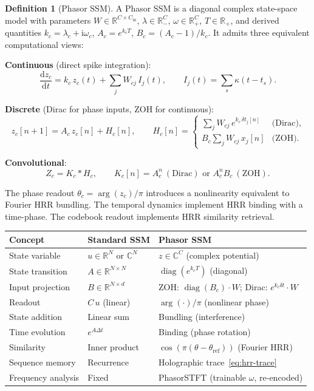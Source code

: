 \documentclass[11pt]{article}
\newcommand{\R}{\mathbb{R}}
\newcommand{\C}{\mathbb{C}}
\newcommand{\im}{\mathrm{i}}
\newcommand{\dd}{\mathrm{d}}
\newcommand{\dt}{\Delta t}
\theoremstyle{definition}
\newtheorem{definition}{Definition}
\begin{document}
\begin{definition}[Phasor SSM]
A Phasor SSM is a diagonal complex state-space model with parameters
$W\in\R^{C\times C_{\mathrm{in}}}$,
$\lambda\in\R^C_-$, $\omega\in\R^C_+$, $T\in\R_+$,
and derived quantities
$k_c = \lambda_c + \im\omega_c$,
$A_c = e^{k_c T}$,
$B_c = (A_c-1)/k_c$.
It admits three equivalent computational views:

\medskip
\noindent\textbf{Continuous} (direct spike integration):
\[
  \frac{\dd z_c}{\dd t} = k_c\,z_c(t) + \sum_j W_{cj}\,I_j(t),
  \qquad I_j(t) = \sum_s \kappa(t-t_s).
\]

\noindent\textbf{Discrete} (Dirac for phase inputs, ZOH for continuous):
\[
  z_c[n+1] = A_c\,z_c[n] + H_c[n],
  \qquad H_c[n] =
  \begin{cases}
    \sum_j W_{cj}\,e^{k_c\,\delta t_j[n]} & \text{(Dirac)},\\
    B_c\sum_j W_{cj}\,x_j[n] & \text{(ZOH)}.
  \end{cases}
\]

\noindent\textbf{Convolutional}:
\[
  Z_c = K_c * H_c, \qquad
  K_c[n] = A_c^n\ (\text{Dirac}) \text{ or } A_c^n B_c\ (\text{ZOH}).
\]

\medskip
\noindent The phase readout $\theta_c = \arg(z_c)/\pi$ introduces a
nonlinearity equivalent to Fourier HRR bundling. The temporal dynamics
implement HRR binding with a time-phase. The codebook readout implements
HRR similarity retrieval.
\end{definition}

\bigskip

\begin{center}
\renewcommand{\arraystretch}{1.2}
\begin{tabular}{@{}lll@{}}
\toprule
\textbf{Concept} & \textbf{Standard SSM} & \textbf{Phasor SSM} \\
\midrule
State variable & $u\in\R^N$ or $\C^N$ & $z\in\C^C$ (complex potential) \\
State transition & $A\in\R^{N\times N}$ & $\operatorname{diag}(e^{k_c T})$
  (diagonal) \\
Input projection & $B\in\R^{N\times d}$ &
  ZOH: $\operatorname{diag}(B_c)\cdot W$;\;
  Dirac: $e^{k_c\delta t}\cdot W$ \\
Readout & $C\,u$ (linear) & $\arg(\cdot)/\pi$ (nonlinear phase) \\
State addition & Linear sum & Bundling (interference) \\
Time evolution & $e^{A\dt}$ & Binding (phase rotation) \\
Similarity & Inner product & $\cos(\pi(\theta-\theta_{\text{ref}}))$
  (Fourier HRR) \\
Sequence memory & Recurrence & Holographic trace~\eqref{eq:hrr-trace} \\
Frequency analysis & Fixed & PhasorSTFT (trainable $\omega$, re-encoded) \\
\bottomrule
\end{tabular}
\end{center}
\end{document}

